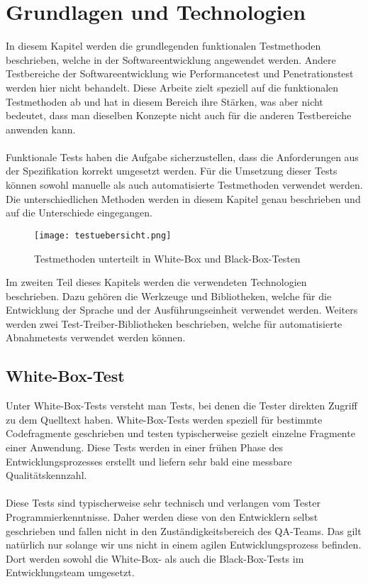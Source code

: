 \chapter{Grundlagen und Technologien}
\label{cha:StandDerTechnik}

In diesem Kapitel werden die grundlegenden funktionalen Testmethoden beschrieben, welche in der Softwareentwicklung angewendet werden. Andere Testbereiche der Softwareentwicklung wie Performancetest und Penetrationstest werden hier nicht behandelt. Diese Arbeite zielt speziell auf die funktionalen Testmethoden ab und hat in diesem Bereich ihre Stärken, was aber nicht bedeutet, dass man dieselben Konzepte nicht auch für die anderen Testbereiche anwenden kann. \\
\\
Funktionale Tests haben die Aufgabe sicherzustellen, dass die Anforderungen aus der Spezifikation korrekt umgesetzt werden. Für die Umsetzung dieser Tests können sowohl manuelle als auch automatisierte Testmethoden verwendet werden. Die unterschiedlichen Methoden werden in diesem Kapitel genau beschrieben und auf die Unterschiede eingegangen.

\begin{figure}
\centering
\texttt{[image: testuebersicht.png]}
\caption{Testmethoden unterteilt in White-Box und Black-Box-Testen}
\label{fig:testtypen}
\end{figure}

Im zweiten Teil dieses Kapitels werden die verwendeten Technologien beschrieben. Dazu gehören die Werkzeuge und Bibliotheken, welche für die Entwicklung der Sprache und der Ausführungseinheit verwendet werden. Weiters werden zwei Test-Treiber-Bibliotheken beschrieben, welche für automatisierte Abnahmetests verwendet werden können. 

\section{White-Box-Test}

Unter White-Box-Tests versteht man Tests, bei denen die Tester direkten Zugriff zu dem Quelltext haben. White-Box-Tests werden speziell für bestimmte Codefragmente geschrieben und testen typischerweise gezielt einzelne Fragmente einer Anwendung. Diese Tests werden in einer frühen Phase des Entwicklungsprozesses erstellt und liefern sehr bald eine messbare Qualitätskennzahl. \\
\\
Diese Tests sind typischerweise sehr technisch und verlangen vom Tester Programmierkenntnisse. Daher werden diese von den Entwicklern selbst geschrieben und fallen nicht in den Zuständigkeitsbereich des QA-Teams. Das gilt natürlich nur solange wir uns nicht in einem agilen Entwicklungsprozess befinden. Dort werden sowohl die White-Box- als auch die Black-Box-Tests im Entwicklungsteam umgesetzt.


